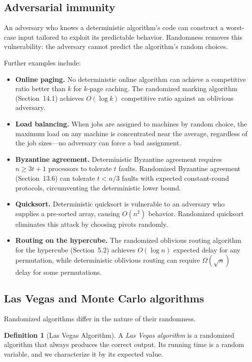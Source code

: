 \documentclass[twoside,12pt]{book}
\theoremstyle{plain}
\theoremstyle{definition}
\newtheorem{definition}[theorem]{Definition}
\theoremstyle{remark}
\begin{document}
\subsection{Adversarial immunity}

An adversary who knows a deterministic algorithm's code can construct a
worst-case input tailored to exploit its predictable behavior. Randomness
removes this vulnerability: the adversary cannot predict the algorithm's
random choices.

Further examples include:
\begin{itemize}
\item \textbf{Online paging.} No deterministic online algorithm can achieve
a competitive ratio better than $k$ for $k$-page caching. The randomized
marking algorithm (Section~14.1) achieves $O(\log k)$ competitive ratio
against an oblivious adversary.
\item \textbf{Load balancing.} When jobs are assigned to machines by random
choice, the maximum load on any machine is concentrated near the average,
regardless of the job sizes---no adversary can force a bad assignment.
\item \textbf{Byzantine agreement.} Deterministic Byzantine agreement
requires $n \ge 3t+1$ processors to tolerate $t$ faults. Randomized
Byzantine agreement (Section~13.6) can tolerate $t < n/3$ faults with
expected constant-round protocols, circumventing the deterministic lower
bound.
\item \textbf{Quicksort.} Deterministic quicksort is vulnerable to an
adversary who supplies a pre-sorted array, causing $O(n^2)$ behavior.
Randomized quicksort eliminates this attack by choosing pivots randomly.
\item \textbf{Routing on the hypercube.} The randomized oblivious routing
algorithm for the hypercube (Section~5.2) achieves $O(\log n)$ expected
delay for any permutation, while deterministic oblivious routing can
require $\Omega(\sqrt{n})$ delay for some permutations.
\end{itemize}

\subsection{Las Vegas and Monte Carlo algorithms}

Randomized algorithms differ in the nature of their randomness.

\begin{definition}[Las Vegas Algorithm]
A \emph{Las Vegas algorithm} is a randomized algorithm that always produces
the correct output. Its running time is a random variable, and we
characterize it by its expected value.
\end{definition}
\end{document}
